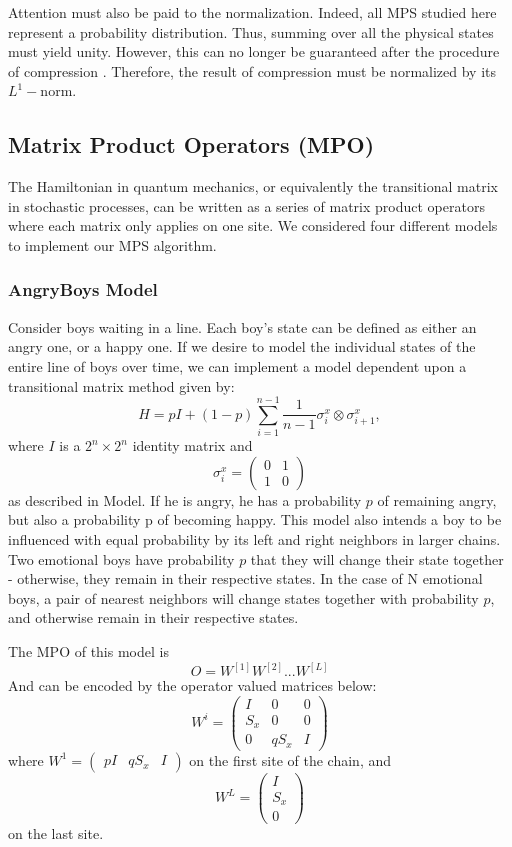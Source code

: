 \documentclass[english]{article}[12pt]
\begin{document}
Attention must also be paid to the normalization. Indeed, all MPS studied here represent a probability distribution. Thus, summing over all the physical states must yield unity. However, this can no longer be guaranteed after the procedure of compression . Therefore, the result of compression must be normalized by its $L^1-$norm.


\subsection{Matrix Product Operators (MPO)}
The Hamiltonian in quantum mechanics, or equivalently the transitional matrix in stochastic processes, can be written as a series of matrix product operators where each matrix only applies on one site.
We considered four different models to implement our MPS algorithm.
\subsubsection{AngryBoys Model}
Consider boys waiting in a line. Each boy's state can be defined as either an angry one, or a happy one. If we desire to model the individual states of the entire line of boys over time, we can implement a model dependent upon a transitional matrix method given by:
\begin{displaymath}
H = pI + (1-p)\sum_{i=1}^{n-1}\frac{1}{n-1}\sigma_i^x\otimes\sigma_{i+1}^x,
\end{displaymath}
where $I$ is a $2^n\times2^n$ identity matrix and 
\begin{displaymath}
\sigma_i^x = 
\begin{pmatrix}
0 & 1 \\
1 & 0
\end{pmatrix}
\end{displaymath}
as described in Model. If he is angry, he has a probability $p$ of remaining angry, but also a probability p of becoming happy. This model also intends a boy to be influenced with equal probability by its left and right neighbors in larger chains. Two emotional boys have probability $p$ that they will change their state together - otherwise, they remain in their respective states. In the case of N emotional boys, a pair of nearest neighbors will change states together with probability $p$, and otherwise remain in their respective states.


The MPO of this model is 
$$
O=W^{[1]}W^{[2]} ... W^{[L]}
$$
And can be encoded by the operator valued matrices below:
$$
W^{i}=
\begin{pmatrix}
I & 0 & 0 \\
S_x & 0 & 0 \\
0 & qS_x & I
\end{pmatrix}
$$
where $W^1=\begin{pmatrix}p I & q S_x & I\end{pmatrix}$ on the first site of the chain, and
$$W^L=\begin{pmatrix}
I \\ S_x \\ 0
\end{pmatrix}$$
on the last site.
\end{document}

